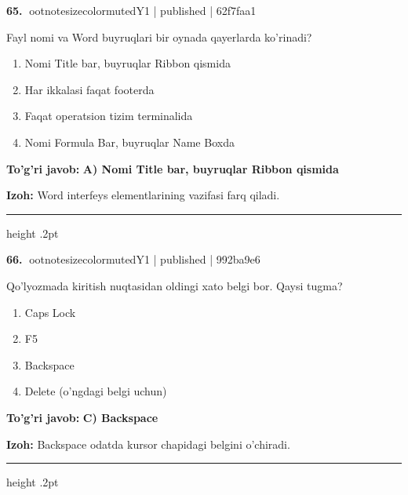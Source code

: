 \documentclass[10pt,a4paper]{article}
\begin{document}
\textbf{\color{ink}65.} {ootnotesizecolor{muted}Y1 | published | 62f7faa1}
\par
Fayl nomi va Word buyruqlari bir oynada qayerlarda ko'rinadi?
\begin{enumerate}[label=\Alph*),leftmargin=9mm]
\item Nomi Title bar, buyruqlar Ribbon qismida
\item Har ikkalasi faqat footerda
\item Faqat operatsion tizim terminalida
\item Nomi Formula Bar, buyruqlar Name Boxda
\end{enumerate}
\begin{tcolorbox}[enhanced,breakable,colback=teal!4,colframe=teal!55!black,boxrule=0.45pt,arc=1.2mm,left=2.8mm,right=2.8mm,top=2mm,bottom=2mm]
\textbf{\color{teal}To'g'ri javob:} \textbf{A) Nomi Title bar, buyruqlar Ribbon qismida}
\par\smallskip
\textbf{Izoh:} Word interfeys elementlarining vazifasi farq qiladi.
\end{tcolorbox}
\vspace{2mm}\hrule height .2pt\vspace{2mm}

\textbf{\color{ink}66.} {ootnotesizecolor{muted}Y1 | published | 992ba9e6}
\par
Qo'lyozmada kiritish nuqtasidan oldingi xato belgi bor. Qaysi tugma?
\begin{enumerate}[label=\Alph*),leftmargin=9mm]
\item Caps Lock
\item F5
\item Backspace
\item Delete (o'ngdagi belgi uchun)
\end{enumerate}
\begin{tcolorbox}[enhanced,breakable,colback=teal!4,colframe=teal!55!black,boxrule=0.45pt,arc=1.2mm,left=2.8mm,right=2.8mm,top=2mm,bottom=2mm]
\textbf{\color{teal}To'g'ri javob:} \textbf{C) Backspace}
\par\smallskip
\textbf{Izoh:} Backspace odatda kursor chapidagi belgini o'chiradi.
\end{tcolorbox}
\vspace{2mm}\hrule height .2pt\vspace{2mm}
\end{document}
